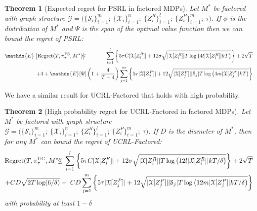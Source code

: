 \documentclass{article}
\newtheorem{theorem}{Theorem}
\newcommand{\Exp}{\mathds{E}}
\newcommand{\Xc}{\mathcal{X}}
\newcommand{\Gc}{\mathcal{G}}
\newcommand{\Sc}{\mathcal{S}}
\begin{document}
\begin{theorem}[Expected regret for PSRL in factored MDPs]
\label{thm: reg PSRL}  \hspace{0.000000001mm} \newline
Let $M^*$ be factored with graph structure $\Gc  = \big( \{ \Sc_i \}_{i=1}^m ; \  \{ \Xc_i \}_{i=1}^n ; \   \{ Z^R_i \}_{i=1}^l;\  \{ Z^P_i \}_{i=1}^m;\  \tau \big)$.
If $\phi$ is the distribution of $M^*$ and $\Psi$ is the span of the optimal value function then we can bound the regret of PSRL:
\begin{eqnarray}
	\Exp \left[\mathrm{Regret}(T, \pi^{\rm PS}_{\tau}, M^*) \right]
        \hspace{-3mm} &\le& \hspace{-2mm}
		\sum_{i=1}^l \left\{ 5\tau C |\Xc[Z^R_i]| + 12\sigma\sqrt{| \Xc[Z^R_i]| T \log\left(4 l | \Xc[Z^R_i] | k T\right)} \right\} \nonumber +2 \sqrt{T} \\
	&& \hspace{-36mm} + 4 + \Exp[\Psi] \left( 1 + \frac{4}{T-4} \right) \sum_{j=1}^m \left\{ 5\tau |\Xc[Z^P_j]| + 12\sqrt{| \Xc[Z^P_j]| |\Sc_j |   T \log\left(4 m | \Xc[Z^P_j] | k T\right)} \right\}
\end{eqnarray}
\end{theorem}

We have a similar result for UCRL-Factored that holds with high probability.
\begin{theorem}[High probability regret for UCRL-Factored in factored MDPs]
\label{thm: reg UCRL-Factored}  \hspace{0.000000001mm} \newline
Let $M^*$ be factored with graph structure $\Gc  = \big( \{ \Sc_i \}_{i=1}^m ; \  \{ \Xc_i \}_{i=1}^n ; \   \{ Z^R_i \}_{i=1}^l;\  \{ Z^P_i \}_{i=1}^m;\  \tau \big)$.
If $D$ is the diameter of $M^*$, then for any $M^*$ can bound the regret of UCRL-Factored:
\begin{eqnarray}
	\mathrm{Regret}(T, \pi^{\rm UC}_{\tau}, M^*)
    \hspace{-3mm} &\le& \hspace{-2mm}
    \sum_{i=1}^l \left\{ 5\tau C |\Xc[Z^R_i]| + 12\sigma\sqrt{ | \Xc[Z^R_i]| T \log\left(12 l | \Xc[Z^R_i] | k T / \delta\right)}  \right\} \nonumber + 2\sqrt{T}\\
	&& \hspace{-37mm} + CD\sqrt{2T \log(6/\delta)}  + \  CD \sum_{j=1}^m \left\{ 5\tau |\Xc[Z^P_j]| + 12\sqrt{| \Xc[Z^P_j]| |\Sc_j |   T \log\left(12 m | \Xc[Z^P_j] | k T / \delta \right)} \right\}
\end{eqnarray}
\normalsize
with probability at least $1-\delta$
\end{theorem}
\end{document}
